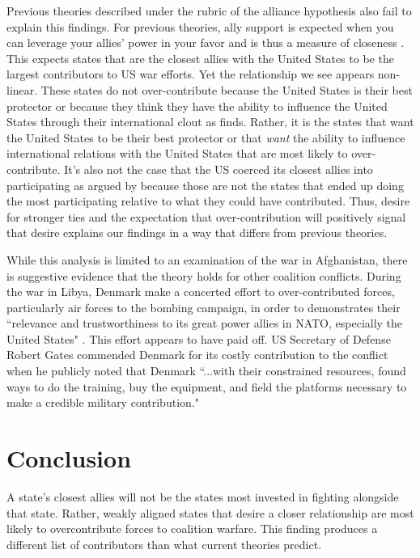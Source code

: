 \documentclass[12pt,letterpaper]{article}
\begin{document}
	Previous theories described under the rubric of the alliance hypothesis also fail to explain this findings. For previous theories, ally support is expected when you can leverage your allies' power in your favor and is thus a measure of closeness \citep{davidson_neoclassicalrealistexplanation_2011}. This expects states that are the closest allies with the United States to be the largest contributors to US war efforts. Yet the relationship we see appears non-linear. These states do not over-contribute because the United States is their best protector or because they think they have the ability to influence the United States through their international clout as \citet{ringsmose_natoburdensharingredux_2010} finds. Rather, it is the states that want the United States to be their best protector or that \textit{want} the ability to influence international relations with the United States that are most likely to over-contribute. It's also not the case that the US coerced its closest allies into participating as argued by \citet{kupchan_natopersiangulf_1988} because those are not the states that ended up doing the most participating relative to what they could have contributed. Thus, desire for stronger ties and the expectation that over-contribution will positively signal that desire explains our findings in a way that differs from previous theories.

	While this analysis is limited to an examination of the war in Afghanistan, there is suggestive evidence that the theory holds for other coalition conflicts. During the war in Libya, Denmark make a concerted effort to over-contributed forces, particularly air forces to the bombing campaign, in order to demonstrates their ``relevance and trustworthiness to its great power allies in NATO, especially the United States" \citep{jakobsen_prestigeseekingsmallstates_2018, dicke_natoburdensharinglibya_2013}. This effort appears to have paid off. US Secretary of Defense Robert Gates commended Denmark for its costly contribution to the conflict when he publicly noted that Denmark ``...with their constrained resources, found ways to do the training, buy the equipment, and field the platforms necessary to make a credible military contribution."

\section{Conclusion}
	A state's closest allies will not be the states most invested in fighting alongside that state. Rather, weakly aligned states that desire a closer relationship are most likely to overcontribute forces to coalition warfare. This finding produces a different list of contributors than what current theories predict.
	
\end{document}
